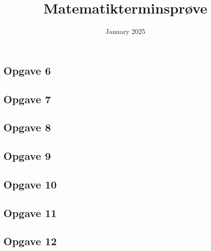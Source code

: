 \documentclass{article}
\title{Matematikterminsprøve}
\date{January 2025}
\begin{document}
\maketitle
\newpage

\begin{center}
    \section*{Opgave 6}
\end{center}





\begin{center}
    \section*{Opgave 7}
\end{center}



\begin{center}
    \section*{Opgave 8}
\end{center}



\begin{center}
    \section*{Opgave 9}
\end{center}



\begin{center}
    \section*{Opgave 10}
\end{center}



\begin{center}
    \section*{Opgave 11}
\end{center}



\begin{center}
    \section*{Opgave 12}
\end{center}

\end{document}
